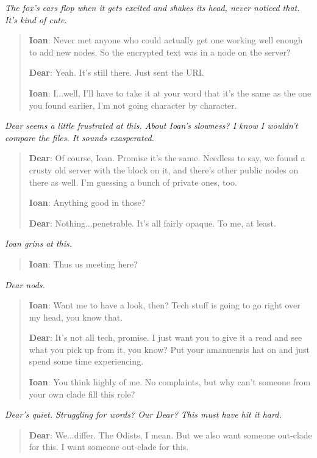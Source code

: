 \emph{The fox's ears flop when it gets excited and shakes its head, never noticed that. It's kind of cute.}

\begin{quote}
\textbf{Ioan}: Never met anyone who could actually get one working well enough to add new nodes. So the encrypted text was in a node on the server?

\textbf{Dear}: Yeah. It's still there. Just sent the URI.

\textbf{Ioan}: I...well, I'll have to take it at your word that it's the same as the one you found earlier, I'm not going character by character.
\end{quote}

\emph{Dear seems a little frustrated at this. About Ioan's slowness? I know I wouldn't compare the files. It sounds exasperated.}

\begin{quote}
\textbf{Dear}: Of course, Ioan. Promise it's the same. Needless to say, we found a crusty old server with the block on it, and there's other public nodes on there as well. I'm guessing a bunch of private ones, too.

\textbf{Ioan}: Anything good in those?

\textbf{Dear}: Nothing...penetrable. It's all fairly opaque. To me, at least.
\end{quote}

\emph{Ioan grins at this.}

\begin{quote}
\textbf{Ioan}: Thus us meeting here?
\end{quote}

\emph{Dear nods.}

\begin{quote}
\textbf{Ioan}: Want me to have a look, then? Tech stuff is going to go right over my head, you know that.

\textbf{Dear}: It's not all tech, promise. I just want you to give it a read and see what you pick up from it, you know? Put your amanuensis hat on and just spend some time experiencing.

\textbf{Ioan}: You think highly of me. No complaints, but why can't someone from your own clade fill this role?
\end{quote}

\emph{Dear's quiet. Struggling for words? Our Dear? This must have hit it hard.}

\begin{quote}
\textbf{Dear}: We...differ. The Odists, I mean. But we also want someone out-clade for this. I want someone out-clade for this.
\end{quote}


